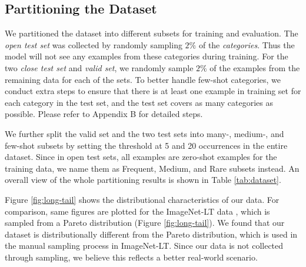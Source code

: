 \documentclass{article}
\begin{document}
\subsection{Partitioning the Dataset}
We partitioned the dataset into different subsets for training and evaluation. The \textit{open test set} was collected by randomly sampling $2\%$ of the \textit{categories}. Thus the model will not see any examples from these categories during training. For the two \textit{close test set} and \textit{valid set}, we randomly sample $2\%$ of the examples from the remaining data for each of the sets. To better handle few-shot categories, we conduct extra steps to ensure that there is at least one example in training set for each category in the test set, and the test set covers as many categories as possible. Please refer to Appendix B for detailed steps.

We further split the valid set and the two test sets into many-, medium-, and few-shot subsets by setting the threshold at 5 and 20 occurrences in the entire dataset. Since in open test sets, all examples are zero-shot examples for the training data, we name them as Frequent, Medium, and Rare subsets instead. An overall view of the whole partitioning results is shown in Table \ref{tab:dataset}.

Figure \ref{fig:long-tail} shows the distributional characteristics of our data. For comparison, same figures are plotted for the ImageNet-LT data \cite{liu2019large}, which is sampled from a Pareto distribution (Figure \ref{fig:long-tail}). We found that our dataset is distributionally different from the Pareto distribution, which is used in the manual sampling process in ImageNet-LT. Since our data is not collected through sampling, we believe this reflects a better real-world scenario.
\end{document}

